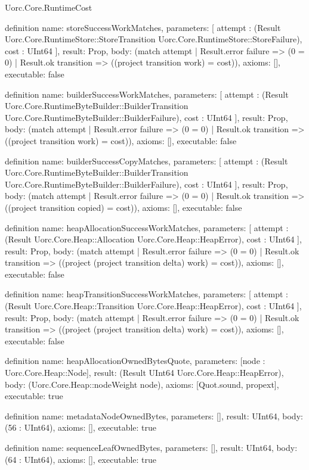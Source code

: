 \begin{lexlean}{Uorc.Core.RuntimeCost}
\begin{semanticmodule}
definition{
  name: storeSuccessWorkMatches,
  parameters: [
    attempt : (Result Uorc.Core.RuntimeStore::StoreTransition Uorc.Core.RuntimeStore::StoreFailure),
    cost : UInt64
  ],
  result: Prop,
  body: (match attempt
    | Result.error failure => (0 = 0)
    | Result.ok transition => ((project transition work) = cost)),
  axioms: [],
  executable: false
}

definition{
  name: builderSuccessWorkMatches,
  parameters: [
    attempt : (Result Uorc.Core.RuntimeByteBuilder::BuilderTransition Uorc.Core.RuntimeByteBuilder::BuilderFailure),
    cost : UInt64
  ],
  result: Prop,
  body: (match attempt
    | Result.error failure => (0 = 0)
    | Result.ok transition => ((project transition work) = cost)),
  axioms: [],
  executable: false
}

definition{
  name: builderSuccessCopyMatches,
  parameters: [
    attempt : (Result Uorc.Core.RuntimeByteBuilder::BuilderTransition Uorc.Core.RuntimeByteBuilder::BuilderFailure),
    cost : UInt64
  ],
  result: Prop,
  body: (match attempt
    | Result.error failure => (0 = 0)
    | Result.ok transition => ((project transition copied) = cost)),
  axioms: [],
  executable: false
}

definition{
  name: heapAllocationSuccessWorkMatches,
  parameters: [
    attempt : (Result Uorc.Core.Heap::Allocation Uorc.Core.Heap::HeapError),
    cost : UInt64
  ],
  result: Prop,
  body: (match attempt
    | Result.error failure => (0 = 0)
    | Result.ok transition => ((project (project transition delta) work) = cost)),
  axioms: [],
  executable: false
}

definition{
  name: heapTransitionSuccessWorkMatches,
  parameters: [
    attempt : (Result Uorc.Core.Heap::Transition Uorc.Core.Heap::HeapError),
    cost : UInt64
  ],
  result: Prop,
  body: (match attempt
    | Result.error failure => (0 = 0)
    | Result.ok transition => ((project (project transition delta) work) = cost)),
  axioms: [],
  executable: false
}

definition{
  name: heapAllocationOwnedBytesQuote,
  parameters: [node : Uorc.Core.Heap::Node],
  result: (Result UInt64 Uorc.Core.Heap::HeapError),
  body: (Uorc.Core.Heap::nodeWeight node),
  axioms: [Quot.sound, propext],
  executable: true
}

definition{
  name: metadataNodeOwnedBytes,
  parameters: [],
  result: UInt64,
  body: (56 : UInt64),
  axioms: [],
  executable: true
}

definition{
  name: sequenceLeafOwnedBytes,
  parameters: [],
  result: UInt64,
  body: (64 : UInt64),
  axioms: [],
  executable: true
}


\end{semanticmodule}
\end{lexlean}
